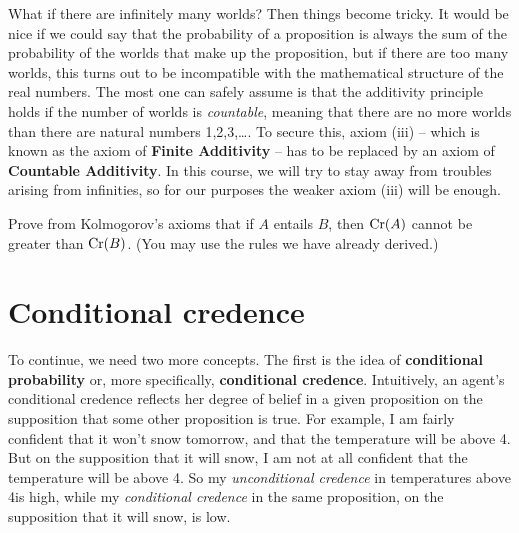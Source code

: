 What if there are infinitely many worlds? Then things become tricky.
It would be nice if we could say that the probability of a proposition
is always the sum of the probability of the worlds that make up the
proposition, but if there are too many worlds, this turns out to be
incompatible with the mathematical structure of the real numbers. The
most one can safely assume is that the additivity principle holds if
the number of worlds is \emph{countable}, meaning that there are no
more worlds than there are natural numbers 1,2,3,\ldots. To secure
this, axiom (iii) -- which is known as the axiom of \textbf{Finite
  Additivity} -- has to be replaced by an axiom of \textbf{Countable
  Additivity}. 
%
%
In this course, we will try to stay away from troubles arising from
infinities, so for our purposes the weaker axiom (iii) will be enough.

\begin{exercise}{3}
  Prove from Kolmogorov's axioms that if $A$ entails $B$, then
  $\text{Cr}(A)$ cannot be greater than $\text{Cr}(B)$. (You may use the rules we
  have already derived.)%
\end{exercise}


\section{Conditional credence}\label{sec:conditional}

To continue, we need two more concepts. The first is the idea of
\textbf{conditional probability} or, more specifically,
\textbf{conditional credence}.  Intuitively, an agent's conditional
credence reflects her degree of belief in a given proposition on the
supposition that some other proposition is true. For example, I am
fairly confident that it won't snow tomorrow, and that the temperature
will be above 4\celsius. But on the supposition that it will snow, I
am not at all confident that the temperature will be above
4\celsius. So my \emph{unconditional credence} in temperatures above
4\celsius is high, while my \emph{conditional credence} in the same
proposition, on the supposition that it will snow, is low.

